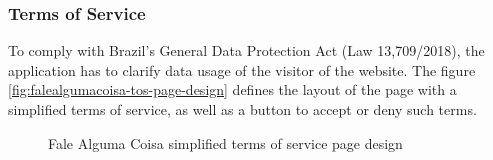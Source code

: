 \subsubsection{Terms of Service}

To comply with Brazil's General Data Protection Act (Law 13,709/2018), the application has to clarify data usage of the visitor of the website. The figure \ref{fig:falealgumacoisa-tos-page-design} defines the layout of the page with a simplified terms of service, as well as a button to accept or deny such terms.

\begin{figure}[ht]
    \centering
    \caption{Fale Alguma Coisa simplified terms of service page design}

\end{figure}
